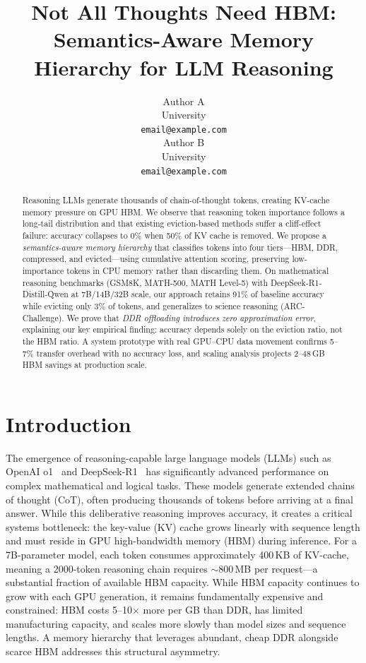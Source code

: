 \documentclass{article}
\title{Not All Thoughts Need HBM: Semantics-Aware Memory Hierarchy for LLM Reasoning}
\author{
  Author A \\
  University \\
  \texttt{email@example.com} \\
  \And
  Author B \\
  University \\
  \texttt{email@example.com} \\
}
\begin{document}
\maketitle

\begin{abstract}

Reasoning LLMs generate thousands of chain-of-thought tokens, creating KV-cache memory pressure on GPU HBM.
We observe that reasoning token importance follows a long-tail distribution and that existing eviction-based methods suffer a cliff-effect failure: accuracy collapses to 0\% when 50\% of KV cache is removed.
We propose a \emph{semantics-aware memory hierarchy} that classifies tokens into four tiers---HBM, DDR, compressed, and evicted---using cumulative attention scoring, preserving low-importance tokens in CPU memory rather than discarding them.
On mathematical reasoning benchmarks (GSM8K, MATH-500, MATH Level-5) with DeepSeek-R1-Distill-Qwen at 7B/14B/32B scale, our approach retains 91\% of baseline accuracy while evicting only 3\% of tokens, and generalizes to science reasoning (ARC-Challenge).
We prove that \emph{DDR offloading introduces zero approximation error}, explaining our key empirical finding: accuracy depends solely on the eviction ratio, not the HBM ratio.
A system prototype with real GPU--CPU data movement confirms 5--7\% transfer overhead with no accuracy loss, and scaling analysis projects 2--48\,GB HBM savings at production scale.

\end{abstract}

\section{Introduction}
\label{sec:intro}

The emergence of reasoning-capable large language models (LLMs) such as OpenAI o1~\cite{openai_o1} and DeepSeek-R1~\cite{deepseekr1} has significantly advanced performance on complex mathematical and logical tasks.
These models generate extended chains of thought (CoT), often producing thousands of tokens before arriving at a final answer.
While this deliberative reasoning improves accuracy, it creates a critical systems bottleneck: the key-value (KV) cache grows linearly with sequence length and must reside in GPU high-bandwidth memory (HBM) during inference.
For a 7B-parameter model, each token consumes approximately 400\,KB of KV-cache, meaning a 2000-token reasoning chain requires ${\sim}800$\,MB per request---a substantial fraction of available HBM capacity.
While HBM capacity continues to grow with each GPU generation, it remains fundamentally expensive and constrained: HBM costs 5--10$\times$ more per GB than DDR, has limited manufacturing capacity, and scales more slowly than model sizes and sequence lengths.
A memory hierarchy that leverages abundant, cheap DDR alongside scarce HBM addresses this structural asymmetry.
\end{document}
